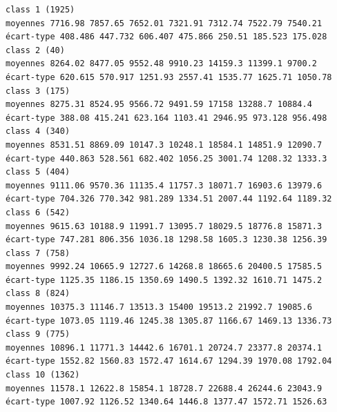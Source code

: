 \documentclass[environments,article,submit,pdftex,moreauthors]{Definitions/mdpi}
\begin{document}
\begin{scriptsize}
\begin{verbatim}
class 1 (1925)
moyennes 7716.98 7857.65 7652.01 7321.91 7312.74 7522.79 7540.21
écart-type 408.486 447.732 606.407 475.866 250.51 185.523 175.028
class 2 (40)
moyennes 8264.02 8477.05 9552.48 9910.23 14159.3 11399.1 9700.2
écart-type 620.615 570.917 1251.93 2557.41 1535.77 1625.71 1050.78
class 3 (175)
moyennes 8275.31 8524.95 9566.72 9491.59 17158 13288.7 10884.4
écart-type 388.08 415.241 623.164 1103.41 2946.95 973.128 956.498
class 4 (340)
moyennes 8531.51 8869.09 10147.3 10248.1 18584.1 14851.9 12090.7
écart-type 440.863 528.561 682.402 1056.25 3001.74 1208.32 1333.3
class 5 (404)
moyennes 9111.06 9570.36 11135.4 11757.3 18071.7 16903.6 13979.6
écart-type 704.326 770.342 981.289 1334.51 2007.44 1192.64 1189.32
class 6 (542)
moyennes 9615.63 10188.9 11991.7 13095.7 18029.5 18776.8 15871.3
écart-type 747.281 806.356 1036.18 1298.58 1605.3 1230.38 1256.39
class 7 (758)
moyennes 9992.24 10665.9 12727.6 14268.8 18665.6 20400.5 17585.5
écart-type 1125.35 1186.15 1350.69 1490.5 1392.32 1610.71 1475.2
class 8 (824)
moyennes 10375.3 11146.7 13513.3 15400 19513.2 21992.7 19085.6
écart-type 1073.05 1119.46 1245.38 1305.87 1166.67 1469.13 1336.73
class 9 (775)
moyennes 10896.1 11771.3 14442.6 16701.1 20724.7 23377.8 20374.1
écart-type 1552.82 1560.83 1572.47 1614.67 1294.39 1970.08 1792.04
class 10 (1362)
moyennes 11578.1 12622.8 15854.1 18728.7 22688.4 26244.6 23043.9
écart-type 1007.92 1126.52 1340.64 1446.8 1377.47 1572.71 1526.63


\end{verbatim}
\end{scriptsize}
\end{document}
